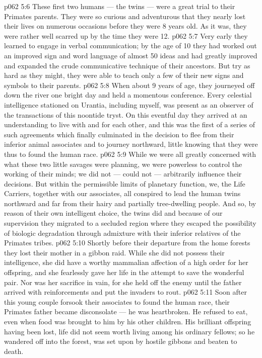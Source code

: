 \vs p062 5:6 These first two humans --- the twins --- were a great trial to their Primates parents. They were so curious and adventurous that they nearly lost their lives on numerous occasions before they were 8 years old. As it was, they were rather well scarred up by the time they were 12.
\vs p062 5:7 Very early they learned to engage in verbal communication; by the age of 10 they had worked out an improved sign and word language of almost 50 ideas and had greatly improved and expanded the crude communicative technique of their ancestors. But try as hard as they might, they were able to teach only a few of their new signs and symbols to their parents.
\vs p062 5:8 When about 9 years of age, they journeyed off down the river one bright day and held a momentous conference. Every celestial intelligence stationed on Urantia, including myself, was present as an observer of the transactions of this noontide tryst. On this eventful day they arrived at an understanding to live with and for each other, and this was the first of a series of such agreements which finally culminated in the decision to flee from their inferior animal associates and to journey northward, little knowing that they were thus to found the human race.
\vs p062 5:9 While we were all greatly concerned with what these two little savages were planning, we were powerless to control the working of their minds; we did not --- could not --- arbitrarily influence their decisions. But within the permissible limits of planetary function, we, the Life Carriers, together with our associates, all conspired to lead the human twins northward and far from their hairy and partially tree\hyp{}dwelling people. And so, by reason of their own intelligent choice, the twins did  and because of our supervision they migrated  to a secluded region where they escaped the possibility of biologic degradation through admixture with their inferior relatives of the Primates tribes.
\vs p062 5:10 Shortly before their departure from the home forests they lost their mother in a gibbon raid. While she did not possess their intelligence, she did have a worthy mammalian affection of a high order for her offspring, and she fearlessly gave her life in the attempt to save the wonderful pair. Nor was her sacrifice in vain, for she held off the enemy until the father arrived with reinforcements and put the invaders to rout.
\vs p062 5:11 Soon after this young couple forsook their associates to found the human race, their Primates father became disconsolate --- he was heartbroken. He refused to eat, even when food was brought to him by his other children. His brilliant offspring having been lost, life did not seem worth living among his ordinary fellows; so he wandered off into the forest, was set upon by hostile gibbons and beaten to death.

